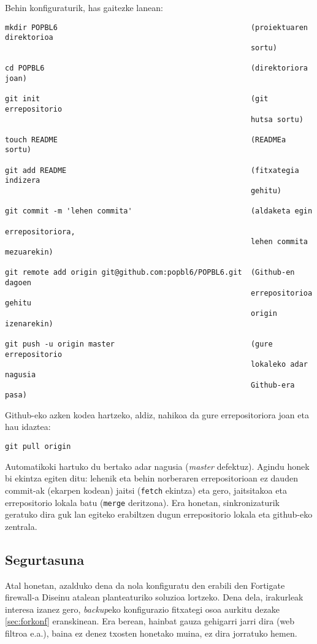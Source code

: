 Behin konfiguraturik, has gaitezke lanean:

\begin{verbatim}
mkdir POPBL6                                            (proiektuaren direktorioa 
                                                        sortu)

cd POPBL6                                               (direktoriora joan)

git init                                                (git errepositorio 
                                                        hutsa sortu)

touch README                                            (READMEa sortu)

git add README                                          (fitxategia indizera 
                                                        gehitu)

git commit -m 'lehen commita'                           (aldaketa egin 
                                                        errepositoriora, 
                                                        lehen commita mezuarekin)

git remote add origin git@github.com:popbl6/POPBL6.git  (Github-en dagoen 
                                                        errepositorioa gehitu
                                                        origin izenarekin)

git push -u origin master                               (gure errepositorio 
                                                        lokaleko adar nagusia  
                                                        Github-era pasa)
\end{verbatim}

Github-eko azken kodea hartzeko, aldiz, nahikoa da gure errepositoriora joan eta hau idaztea:

\begin{verbatim}
git pull origin
\end{verbatim}

Automatikoki hartuko du bertako adar nagusia (\textit{master} defektuz). Agindu honek bi ekintza egiten ditu: lehenik eta behin norberaren errepositorioan ez dauden commit-ak (ekarpen kodean) jaitsi (\texttt{fetch} ekintza) eta gero, jaitsitakoa eta errepositorio lokala batu (\texttt{merge} deritzona). Era honetan, sinkronizaturik geratuko dira guk lan egiteko erabiltzen dugun errepositorio lokala eta github-eko zentrala.

\subsection{Segurtasuna}
Atal honetan, azalduko dena da nola konfiguratu den erabili den Fortigate firewall-a Diseinu atalean planteaturiko soluzioa lortzeko. Dena dela, irakurleak interesa izanez gero, \textit{backup}eko konfigurazio fitxategi osoa aurkitu dezake \ref{sec:forkonf} eranskinean. Era berean, hainbat gauza gehigarri jarri dira (web filtroa e.a.), baina ez denez txosten honetako muina, ez dira jorratuko hemen.

